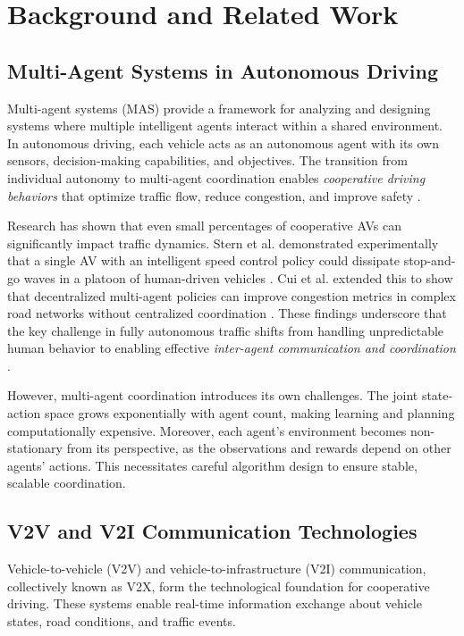 \documentclass[conference]{IEEEtran}
\begin{document}
\section{Background and Related Work}

\subsection{Multi-Agent Systems in Autonomous Driving}

Multi-agent systems (MAS) provide a framework for analyzing and designing systems where multiple intelligent agents interact within a shared environment. In autonomous driving, each vehicle acts as an autonomous agent with its own sensors, decision-making capabilities, and objectives. The transition from individual autonomy to multi-agent coordination enables \textit{cooperative driving behaviors} that optimize traffic flow, reduce congestion, and improve safety \cite{kaufeld2024investigating}.

Research has shown that even small percentages of cooperative AVs can significantly impact traffic dynamics. Stern et al. demonstrated experimentally that a single AV with an intelligent speed control policy could dissipate stop-and-go waves in a platoon of human-driven vehicles \cite{stern2018dissipation}. Cui et al. extended this to show that decentralized multi-agent policies can improve congestion metrics in complex road networks without centralized coordination \cite{cui2021scalable}. These findings underscore that the key challenge in fully autonomous traffic shifts from handling unpredictable human behavior to enabling effective \textit{inter-agent communication and coordination} \cite{dinneweth2022multi}.

However, multi-agent coordination introduces its own challenges. The joint state-action space grows exponentially with agent count, making learning and planning computationally expensive. Moreover, each agent's environment becomes non-stationary from its perspective, as the observations and rewards depend on other agents' actions. This necessitates careful algorithm design to ensure stable, scalable coordination.

\subsection{V2V and V2I Communication Technologies}

Vehicle-to-vehicle (V2V) and vehicle-to-infrastructure (V2I) communication, collectively known as V2X, form the technological foundation for cooperative driving. These systems enable real-time information exchange about vehicle states, road conditions, and traffic events.
\end{document}
